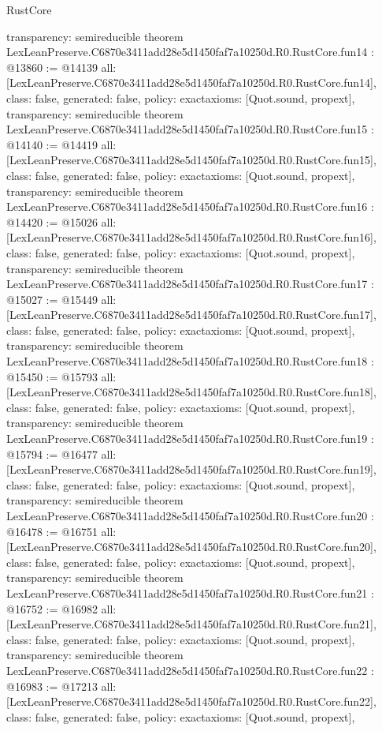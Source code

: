 \begin{lexlean}{RustCore}
\begin{coremodule}
{  transparency: semireducible
}
theorem LexLeanPreserve.C6870e3411add28e5d1450faf7a10250d.R0.RustCore.fun14 : @13860 := @14139 {
  all: [LexLeanPreserve.C6870e3411add28e5d1450faf7a10250d.R0.RustCore.fun14],
  class: false,
  generated: false,
  policy: exact{axioms: [Quot.sound, propext]},
  transparency: semireducible
}
theorem LexLeanPreserve.C6870e3411add28e5d1450faf7a10250d.R0.RustCore.fun15 : @14140 := @14419 {
  all: [LexLeanPreserve.C6870e3411add28e5d1450faf7a10250d.R0.RustCore.fun15],
  class: false,
  generated: false,
  policy: exact{axioms: [Quot.sound, propext]},
  transparency: semireducible
}
theorem LexLeanPreserve.C6870e3411add28e5d1450faf7a10250d.R0.RustCore.fun16 : @14420 := @15026 {
  all: [LexLeanPreserve.C6870e3411add28e5d1450faf7a10250d.R0.RustCore.fun16],
  class: false,
  generated: false,
  policy: exact{axioms: [Quot.sound, propext]},
  transparency: semireducible
}
theorem LexLeanPreserve.C6870e3411add28e5d1450faf7a10250d.R0.RustCore.fun17 : @15027 := @15449 {
  all: [LexLeanPreserve.C6870e3411add28e5d1450faf7a10250d.R0.RustCore.fun17],
  class: false,
  generated: false,
  policy: exact{axioms: [Quot.sound, propext]},
  transparency: semireducible
}
theorem LexLeanPreserve.C6870e3411add28e5d1450faf7a10250d.R0.RustCore.fun18 : @15450 := @15793 {
  all: [LexLeanPreserve.C6870e3411add28e5d1450faf7a10250d.R0.RustCore.fun18],
  class: false,
  generated: false,
  policy: exact{axioms: [Quot.sound, propext]},
  transparency: semireducible
}
theorem LexLeanPreserve.C6870e3411add28e5d1450faf7a10250d.R0.RustCore.fun19 : @15794 := @16477 {
  all: [LexLeanPreserve.C6870e3411add28e5d1450faf7a10250d.R0.RustCore.fun19],
  class: false,
  generated: false,
  policy: exact{axioms: [Quot.sound, propext]},
  transparency: semireducible
}
theorem LexLeanPreserve.C6870e3411add28e5d1450faf7a10250d.R0.RustCore.fun20 : @16478 := @16751 {
  all: [LexLeanPreserve.C6870e3411add28e5d1450faf7a10250d.R0.RustCore.fun20],
  class: false,
  generated: false,
  policy: exact{axioms: [Quot.sound, propext]},
  transparency: semireducible
}
theorem LexLeanPreserve.C6870e3411add28e5d1450faf7a10250d.R0.RustCore.fun21 : @16752 := @16982 {
  all: [LexLeanPreserve.C6870e3411add28e5d1450faf7a10250d.R0.RustCore.fun21],
  class: false,
  generated: false,
  policy: exact{axioms: [Quot.sound, propext]},
  transparency: semireducible
}
theorem LexLeanPreserve.C6870e3411add28e5d1450faf7a10250d.R0.RustCore.fun22 : @16983 := @17213 {
  all: [LexLeanPreserve.C6870e3411add28e5d1450faf7a10250d.R0.RustCore.fun22],
  class: false,
  generated: false,
  policy: exact{axioms: [Quot.sound, propext]},
}
\end{coremodule}
\end{lexlean}
